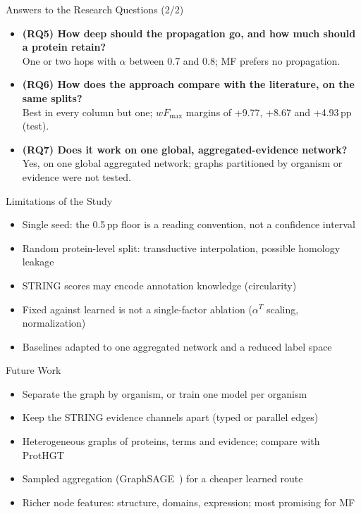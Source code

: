 \documentclass[aspectratio=169,11pt]{beamer}
\newcommand{\wF}{wF_{\max}}
\begin{document}
\begin{frame}{Answers to the Research Questions (2/2)}
  \begin{itemize}\setlength{\itemsep}{0.55em}\small
    \item \textbf{(RQ5) How deep should the propagation go, and how much should a protein retain?}\\
      One or two hops with $\alpha$ between 0.7 and 0.8; MF prefers no propagation.
    \item \textbf{(RQ6) How does the approach compare with the literature, on the same splits?}\\
      Best in every column but one; $\wF$ margins of +9.77, +8.67 and +4.93\,pp (test).
    \item \textbf{(RQ7) Does it work on one global, aggregated-evidence network?}\\
      Yes, on one global aggregated network; graphs partitioned by organism or evidence were not tested.
  \end{itemize}
\end{frame}

\begin{frame}{Limitations of the Study}
  \begin{itemize}\setlength{\itemsep}{0.45em}
    \item Single seed: the 0.5\,pp floor is a reading convention, not a confidence interval
    \item Random protein-level split: transductive interpolation, possible homology leakage
    \item STRING scores may encode annotation knowledge (circularity)
    \item Fixed against learned is not a single-factor ablation ($\alpha^{T}$ scaling, normalization)
    \item Baselines adapted to one aggregated network and a reduced label space
  \end{itemize}
\end{frame}

\begin{frame}{Future Work}
  \begin{itemize}\setlength{\itemsep}{0.45em}
    \item Separate the graph by organism, or train one model per organism
    \item Keep the STRING evidence channels apart (typed or parallel edges)
    \item Heterogeneous graphs of proteins, terms and evidence; compare with ProtHGT~\cite{ulusoy2025prothgt}
    \item Sampled aggregation (GraphSAGE~\cite{hamilton2017graphsage}) for a cheaper learned route
    \item Richer node features: structure, domains, expression; most promising for MF
  \end{itemize}
\end{frame}
\end{document}
